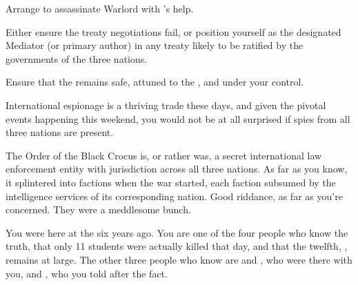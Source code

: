 \documentclass[char]{GL2020}
\begin{document}
\begin{itemz}
    \item Arrange to assassinate Warlord \cLoud{} with \cEvil{}'s help.
    \item Either ensure the treaty negotiations fail, or position yourself as the designated Mediator (or primary author) in any treaty likely to be ratified by the governments of the three nations.
    \item Ensure that the \iMirror{} remains safe, attuned to the \pTech{}, and under your control.
\end{itemz}

\begin{itemz}[Notes]
    \item International espionage is a thriving trade these days, and given the pivotal events happening this weekend, you would not be at all surprised if spies from all three nations are present.
    \item The Order of the Black Crocus is, or rather was, a secret international law enforcement entity with jurisdiction across all three nations. As far as you know, it splintered into factions when the war started, each faction subsumed by the intelligence services of its corresponding nation. Good riddance, as far as you're concerned. They were a meddlesome bunch.
    \item You were here at the \pSchool{} six years ago. You are one of the four people who know the truth, that only 11 students were actually killed that day, and that the twelfth, \cKidScientist{\full}, remains at large. The other three people who know are \cMusic{\full} and \cPrincipal{\full}, who were there with you, and \cEvil{}, who you told after the fact.
\end{itemz}
\end{document}

